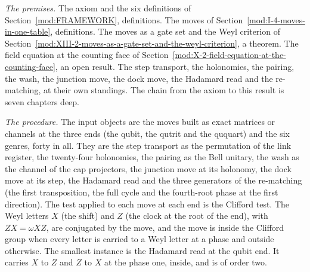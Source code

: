 \begin{chproof}
\textit{The premises.} The axiom and the six definitions of Section~\ref{mod:FRAMEWORK}, definitions. The moves of Section~\ref{mod:I-4-moves-in-one-table}, definitions. The moves as a gate set and the Weyl criterion of Section~\ref{mod:XIII-2-moves-as-a-gate-set-and-the-weyl-criterion}, a theorem. The field equation at the counting face of Section~\ref{mod:X-2-field-equation-at-the-counting-face}, an open result. The step transport, the holonomies, the pairing, the wash, the junction move, the dock move, the Hadamard read and the re-matching, at their own standings. The chain from the axiom to this result is seven chapters deep.

\textit{The procedure.} The input objects are the moves built as exact matrices or channels at the three ends (the qubit, the qutrit and the ququart) and the six genres, forty in all. They are the step transport as the permutation of the link register, the twenty-four holonomies, the pairing as the Bell unitary, the wash as the channel of the cap projectors, the junction move at its holonomy, the dock move at its step, the Hadamard read and the three generators of the re-matching (the first transposition, the full cycle and the fourth-root phase at the first direction). The test applied to each move at each end is the Clifford test. The Weyl letters $X$ (the shift) and $Z$ (the clock at the root of the end), with $ZX=\omega XZ$, are conjugated by the move, and the move is inside the Clifford group when every letter is carried to a Weyl letter at a phase and outside otherwise. The smallest instance is the Hadamard read at the qubit end. It carries $X$ to $Z$ and $Z$ to $X$ at the phase one, inside, and is of order two.


\end{chproof}
